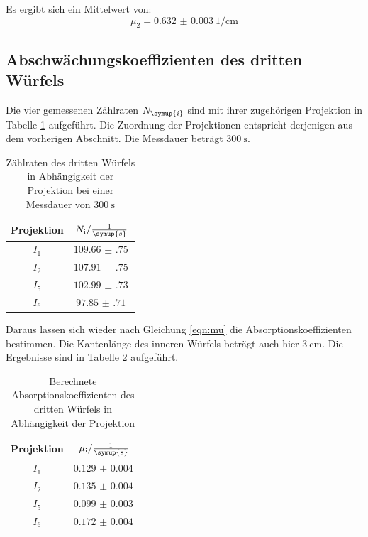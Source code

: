 Es ergibt sich ein Mittelwert von:
\begin{equation*}
  \bar\mu_2 = \SI{0.632(3)}{1\per\centi\meter}
\end{equation*}


\subsection{Abschwächungskoeffizienten des dritten Würfels}

Die vier gemessenen Zählraten $N_\symup{i}$ sind mit ihrer zugehörigen Projektion in Tabelle
\ref{tab:w3} aufgeführt. Die Zuordnung der Projektionen entspricht derjenigen aus dem
vorherigen Abschnitt. Die Messdauer beträgt $\SI{300}{\second}$.

\begin{table}[H]
  \centering
  \caption{Zählraten des dritten Würfels in Abhängigkeit der Projektion bei einer Messdauer von $\SI{300}{\second}$ }
  \label{tab:w3}
  \begin{tabular}{c c}
    \toprule
    Projektion & $N_{\mathrm{i}} / \frac{1}{\symup{s}}$   \\
    \midrule
        $I_1$    & $\SI{109.66(75)}{}$ \\
        $I_2$    & $\SI{107.91(75)}{}$ \\
        $I_5$    & $\SI{102.99(73)}{}$ \\
        $I_6$    & $\SI{97.85(71)}{}$ \\
    \bottomrule
  \end{tabular}
\end{table}

Daraus lassen sich wieder nach Gleichung \ref{eqn:mu} die Absorptionskoeffizienten bestimmen.
Die Kantenlänge des inneren Würfels beträgt auch hier $\SI{3}{\centi\meter}$.
Die Ergebnisse sind in Tabelle \ref{tab:mu3} aufgeführt.

\begin{table}[H]
  \centering
  \caption{Berechnete Absorptionskoeffizienten des dritten Würfels in Abhängigkeit der Projektion}
  \label{tab:mu3}
  \begin{tabular}{c c}
    \toprule
    Projektion & $\mu_{\mathrm{i}} / \frac{1}{\symup{s}}$   \\
    \midrule
        $I_1$    & $\SI{0.129(4)}{}$ \\
        $I_2$    & $\SI{0.135(4)}{}$ \\
        $I_5$    & $\SI{0.099(3)}{}$ \\
        $I_6$    & $\SI{0.172(4)}{}$ \\
    \bottomrule
  \end{tabular}
\end{table}

